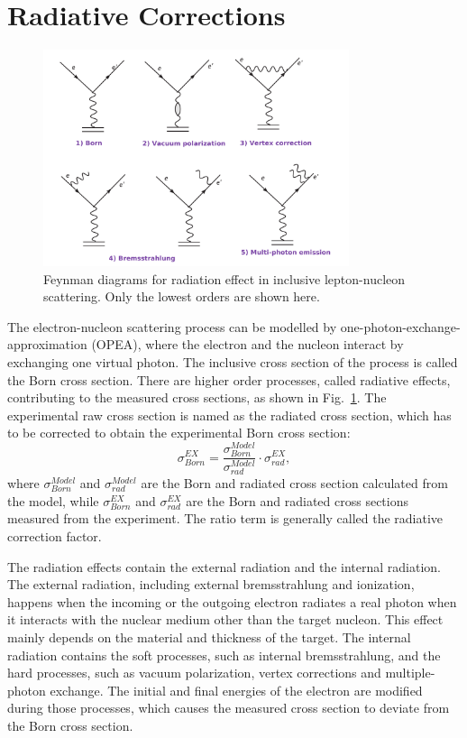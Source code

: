 \section{Radiative Corrections}
\begin{figure}[!ht]
 \begin{center}
  \includegraphics[angle=0,width=0.8\textwidth]{./figures/physics/radiated_feymann}
  \caption[Feynman diagrams for radiation effect]{Feynman diagrams for radiation effect in inclusive lepton-nucleon scattering. Only the lowest orders are shown here.}
  \label{rad_feynm}
 \end{center}
\end{figure} 
 The electron-nucleon scattering process can be modelled by one-photon-exchange-approximation (OPEA), where the electron and the nucleon interact by exchanging one virtual photon. The inclusive cross section of the process is called the Born cross section. There are higher order processes, called radiative effects, contributing to the measured cross sections, as shown in Fig.~\ref{rad_feynm}. The experimental raw cross section is named as the radiated cross section, which has to be corrected to obtain the experimental Born cross section: 
 \begin{equation}
  \sigma^{EX}_{Born} = \frac{\sigma^{Model}_{Born}}{\sigma^{Model}_{rad}}\cdot\sigma^{EX}_{rad},
 \end{equation}
where $\sigma^{Model}_{Born}$ and $\sigma^{Model}_{rad}$ are the Born and radiated cross section calculated from the model, while $\sigma^{EX}_{Born}$ and $\sigma^{EX}_{rad}$ are the Born and radiated cross sections measured from the experiment. The ratio term is generally called the radiative correction factor. 
 
  The radiation effects contain the external radiation and the internal radiation. The external radiation, including external bremsstrahlung and ionization, happens when the incoming or the outgoing electron radiates a real photon when it interacts with the nuclear medium other than the target nucleon. This effect mainly depends on the material and thickness of the target. The internal radiation contains the soft processes, such as internal bremsstrahlung, and the hard processes, such as vacuum polarization, vertex corrections and multiple-photon exchange. The initial and final energies of the electron are modified during those processes, which causes the measured cross section to deviate from the Born cross section.

